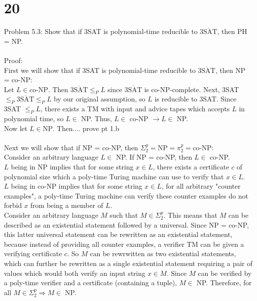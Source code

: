 \documentclass[letterpaper,notitlepage,twoside]{article}
\renewcommand{\implies}{\Rightarrow} %
\begin{document}
\section*{20}
Problem 5.3: Show that if 3SAT is polynomial-time reducible to $\overline{\text{3SAT}}$, then PH = NP.
\\\\
Proof:\\
First we will show that if 3SAT is polynomial-time reducible to $\overline{\text{3SAT}}$, then NP = co-NP:\\
Let $L \in \text{co-NP}$. Then $\overline{\text{3SAT}} \le_P L$ since $\overline{\text{3SAT}}$ is co-NP-complete. Next, 3SAT $\le_P \overline{\text{3SAT}} \le_P L$ by our original assumption, so $L$ is reducible to 3SAT. Since 3SAT $\le_P L$, there exists a TM with input and advice tapes which accepts $L$ in polynomial time, so $L \in$ NP. Thus, $L \in$ co-NP $\rightarrow L \in$ NP.\\
Now let $L \in \text{NP}$. Then.... prove pt 1.b
\\\\
Next we will show that if NP = co-NP, then $\Sigma_2^p = \text{NP} = \pi_2^p = \text{co-NP}$:\\
Consider an arbitrary language $L \in$ NP. If NP = co-NP, then $L \in$ co-NP.\\
$L$ being in NP implies that for some string $x \in L$, there exists a certificate $c$ of polynomial size which a poly-time Turing machine can use to verify that $x \in L$. \\
$L$ being in co-NP implies that for some string $x \in L$, for all arbitrary "counter examples", a poly-time Turing machine can verify these counter examples do not forbid $x$ from being a member of $L$. \\

Consider an arbitrary language $M$ such that $M \in \Sigma_2^p$. This means that $M$ can be described as an existential statement followed by a universal. Since NP = co-NP, this latter universal statement can be rewritten as an existential statement, because instead of providing all counter examples, a verifier TM can be given a verifying certificate $c$. So $M$ can be rewrwitten as two existential statements, which can further be rewritten as a single existential statement requiring a pair of values which would both verify an input string $x \in M$. Since $M$ can be verified by a poly-time verifier and a certificate (containing a tuple), $M \in$ NP. Therefore, for all $M \in \Sigma_2^p \implies M \in$ NP. \\
\end{document}
